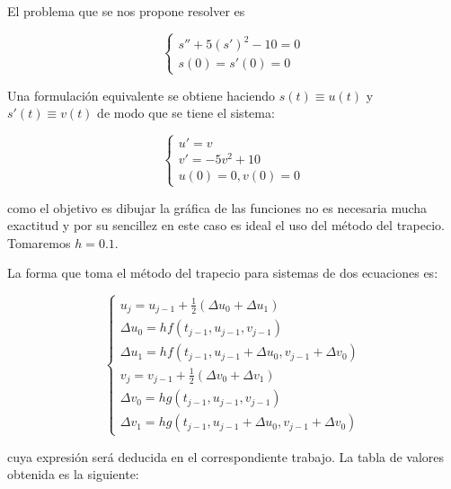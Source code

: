 \documentclass{article}
\theoremstyle{theorem-style}  %
\theoremstyle{definition-style}
\theoremstyle{example-style}
\begin{document}
El problema que se nos propone resolver es 

	\begin{equation*}
		\begin{cases}
			s''+5(s')^2-10=0 \\
			s(0)=s'(0)=0
		\end{cases}
	\end{equation*}

Una formulación equivalente se obtiene haciendo $s(t) \equiv u(t)$ y $s'(t) \equiv v(t)$ de modo que se tiene el sistema:

	\begin{equation*}
		\begin{cases}
			u'=v \\
			v'=-5v^2+10 \\
			u(0)=0,v(0)=0
		\end{cases}
	\end{equation*}

como el objetivo es dibujar la gráfica de las funciones no es necesaria mucha exactitud y por su sencillez en este caso es ideal el uso del método del trapecio. Tomaremos $h = 0.1$. 

La forma que toma el método del trapecio para sistemas de dos ecuaciones es:

	\begin{equation*}
		\begin{cases}
			u_j=u_{j-1}+\frac{1}{2}(\Delta u_0+\Delta u_1) \\
			\Delta u_0 = hf(t_{j-1},u_{j-1},v_{j-1}) \\
			\Delta u_1 = hf(t_{j-1},u_{j-1}+\Delta u_0,v_{j-1}+\Delta v_0) \\
			v_j=v_{j-1}+\frac{1}{2}(\Delta v_0+\Delta v_1) \\
			\Delta v_0 = hg(t_{j-1},u_{j-1},v_{j-1}) \\
			\Delta v_1 = hg(t_{j-1},u_{j-1}+\Delta u_0,v_{j-1}+\Delta v_0)
		\end{cases}
	\end{equation*}
	
cuya expresión será deducida en el correspondiente trabajo. La tabla de valores obtenida es la siguiente:
\end{document}

